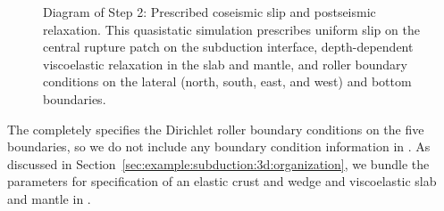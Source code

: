 \begin{figure}[htbp]
  \caption{Diagram of Step 2: Prescribed coseismic slip and
    postseismic relaxation. This quasistatic simulation prescribes
    uniform slip on the central rupture patch on the subduction interface,
    depth-dependent viscoelastic relaxation in the slab and mantle,
    and roller boundary conditions on the lateral (north, south, east,
    and west) and bottom boundaries.}
  \label{fig:example:subduction:3d:step02:diagram}
\end{figure}

The  completely specifies the Dirichlet roller
boundary conditions on the five boundaries, so we do not include any
boundary condition information in . As discussed
in Section~\vref{sec:example:subduction:3d:organization}, we bundle
the parameters for specification of an elastic crust and wedge and
viscoelastic slab and mantle in .

